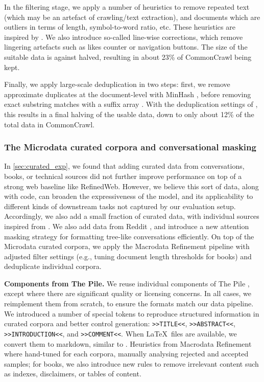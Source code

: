 \documentclass{article}
\begin{document}
In the filtering stage, we apply a number of heuristics to remove repeated text (which may be an artefact of crawling/text extraction), and documents which are outliers in terms of length, symbol-to-word ratio, etc. These heuristics are inspired by \citet{gopher}. We also introduce so-called line-wise corrections, which remove lingering artefacts such as likes counter or navigation buttons. The size of the suitable data is against halved, resulting in about 23\% of CommonCrawl being kept.

Finally, we apply large-scale deduplication in two steps: first, we remove approximate duplicates at the document-level with MinHash \citep{broder1997resemblance}, before removing exact substring matches with a suffix array \citep{manber1993suffix}. With the deduplication settings of \citet{lee2022deduplicating}, this results in a final halving of the usable data, down to only about 12\% of the total data in CommonCrawl.

\subsubsection{The Microdata curated corpora and conversational masking}
\label{sec:micro_data}

In \cref{sec:curated_exp}, we found that adding curated data from conversations, books, or technical sources did not further improve performance on top of a strong web baseline like RefinedWeb. However, we believe this sort of data, along with code, can broaden the expressiveness of the model, and its applicability to different kinds of downstream tasks not captured by our evaluation setup. Accordingly, we also add a small fraction of curated data, with individual sources inspired from \citep{gao2020pile}. We also add data from Reddit \citep{baumgartner2020pushshift}, and introduce a new attention masking strategy for formatting tree-like conversations efficiently. On top of the Microdata curated corpora, we apply the Macrodata Refinement pipeline with adjusted filter settings (e.g., tuning document length thresholds for books) and deduplicate individual corpora.  

\textbf{Components from The Pile.} We reuse individual components of The Pile \citep{gao2020pile}, except where there are significant quality or licensing concerns. In all cases, we reimplement them from scratch, to ensure the formats match our data pipeline. We introduced a number of special tokens to reproduce structured information in curated corpora and better control generation: \texttt{>>TITLE<<}, \texttt{>>ABSTRACT<<}, \texttt{>>INTRODUCTION<<}, and \texttt{>>COMMENT<<}. When \LaTeX~files are available, we convert them to markdown, similar to \citet{lewkowycz2022solving}. Heuristics from Macrodata Refinement where hand-tuned for each corpora, manually analysing rejected and accepted samples; for books, we also introduce new rules to remove irrelevant content such as indexes, disclaimers, or tables of content.
\end{document}
